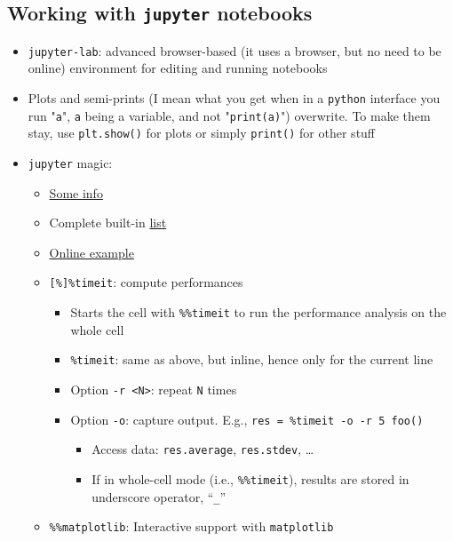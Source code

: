 \documentclass[a4paper,12pt,%
              final%
              ]{article}
\begin{document}
\subsection{Working with \texttt{jupyter} notebooks}
\begin{itemize}
  \item \texttt{jupyter-lab}: advanced browser-based (it uses a browser, but no need to be online) environment for editing and running notebooks
  \item Plots and semi-prints (I mean what you get when in a \texttt{python} interface you run "\texttt{a}", \texttt{a} being a variable, and not "\texttt{print(a)}") overwrite. To make them stay, use \verb|plt.show()| for plots or simply \verb|print()| for other stuff
  \item \texttt{jupyter} magic:
    \begin{itemize}
      \item \href{https://ipython.readthedocs.io/en/stable/interactive/reference.html#magic}{Some info}
      \item Complete built-in \href{https://ipython.readthedocs.io/en/stable/interactive/magics.html}{list}
      \item \href{https://nbviewer.org/github/ipython/ipython/blob/1.x/examples/notebooks/Cell%20Magics.ipynb}{Online example}
      \item \verb|[%]%timeit|: compute performances
        \begin{itemize}
          \item Starts the cell with \verb|%%timeit| to run the performance analysis on the whole cell
          \item \verb|%timeit|: same as above, but inline, hence only for the current line
          \item Option \verb|-r <N>|: repeat \verb|N| times
          \item Option \verb|-o|: capture output. E.g., \verb|res = %timeit -o -r 5 foo()|
            \begin{itemize}
              \item Access data: \verb|res.average|, \verb|res.stdev|, \ldots
              \item If in whole-cell mode (i.e., \verb|%%timeit|), results are stored in underscore operator, ``\verb|_|''
            \end{itemize}
        \end{itemize}
      \item \verb|%%matplotlib|: Interactive support with \texttt{matplotlib}

\end{itemize}
\end{itemize}
\end{document}
